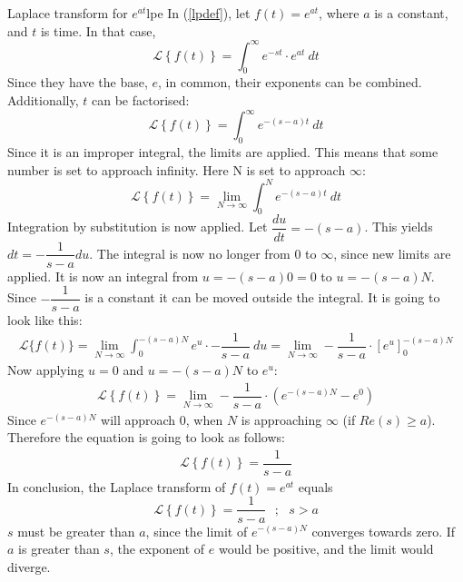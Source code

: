 \begin{example}{Laplace transform for $e^{at}$}{lpe}
In (\ref{lpdef}), let $f(t)=e^{at}$, where $a$ is a constant, and $t$ is time. In that case,
$$\mathcal{L} \left\{f(t) \right\}=\int_{0}^{\infty} e^{-st}\cdot e^{at}\ dt$$
Since they have the base, $e$, in common, their exponents can be combined. Additionally, $t$ can be factorised:
$$\mathcal{L} \left\{f(t) \right\}=\int_{0}^{\infty} e^{-(s-a)t}\ dt$$
Since it is an improper integral, the limits are applied. This means that some number is set to approach infinity. Here N is set to approach $\infty$:
$$\mathcal{L} \left\{f(t) \right\}=\lim_{N \to \infty} \int_{0}^{N} e^{-(s-a)t}\ dt$$
Integration by substitution is now applied. Let $\dfrac{du}{dt}=-(s-a)$. This yields $dt=-\dfrac{1}{s-a}du$. The integral is now no longer from 0 to $\infty$, since new limits are applied. It is now an integral from $u=-(s-a)0=0$ to $u=-(s-a)N$. Since $-\dfrac{1}{s-a}$ is a constant it can be moved outside the integral. It is going to look like this:
\begin{align}
\mathcal{L}\{f(t)\}=\lim_{N \to \infty} \int_{0}^{-(s-a)N} e^{u}\cdot -\dfrac{1}{s-a}\ du = \lim_{N \to \infty} -\dfrac{1}{s-a} \cdot \left[e^{u} \right]_{0}^{-(s-a)N}
\label{eq6.2}
\end{align}
Now applying $u=0$ and $u=-(s-a)N$ to $e^{u}$:
\begin{align*}
\mathcal{L} \left\{f(t) \right\} =\lim_{N \to \infty} -\dfrac{1}{s-a}\cdot (e^{-(s-a)N}-e^{0})
\end{align*}
Since $e^{-(s-a)N}$ will approach $0$, when $N$ is approaching $\infty$ (if $Re(s) \geq a$). Therefore the equation is going to look as follows:
\begin{align}
\mathcal{L} \left\{f(t) \right\} = \dfrac{1}{s-a}
\end{align}
In conclusion, the Laplace transform of $f(t)=e^{at}$ equals
$$\mathcal{L} \left\{f(t) \right\} =\dfrac{1}{s-a} \ \ \ ;\ \ \ s>a$$
$s$ must be greater than $a$, since the limit of $e^{-(s-a)N}$ converges towards zero. If $a$ is greater than $s$, the exponent of $e$ would be positive, and the limit would diverge.
\end{example}
